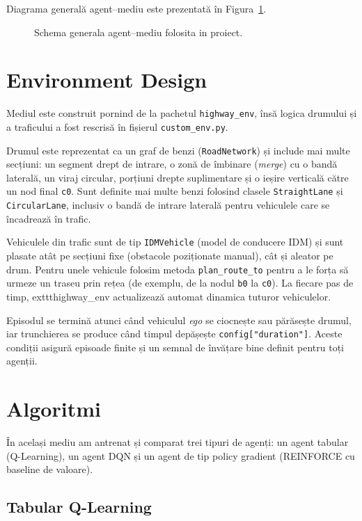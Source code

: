\documentclass[11pt,a4paper]{article}
\begin{document}
Diagrama generală agent--mediu este prezentată în Figura~\ref{fig:rl-loop}.
\begin{figure}[h]
  \centering
  \RLLoopDiagram
  \caption{Schema generala agent--mediu folosita in proiect.}
  \label{fig:rl-loop}
\end{figure}

\section{Environment Design}

Mediul este construit pornind de la pachetul \texttt{highway\_env}, însă logica drumului și a
traficului a fost rescrisă în fișierul \texttt{custom\_env.py}.

Drumul este reprezentat ca un graf de benzi (\texttt{RoadNetwork}) și include mai multe secțiuni:
un segment drept de intrare, o zonă de îmbinare (\emph{merge}) cu o bandă laterală, un viraj
circular, porțiuni drepte suplimentare și o ieșire verticală către un nod final \texttt{c0}.
Sunt definite mai multe benzi folosind clasele \texttt{StraightLane} și \texttt{CircularLane},
inclusiv o bandă de intrare laterală pentru vehiculele care se încadrează în trafic.

Vehiculele din trafic sunt de tip \texttt{IDMVehicle} (model de conducere IDM) și sunt plasate
atât pe secțiuni fixe (obstacole poziționate manual), cât și aleator pe drum. Pentru unele
vehicule folosim metoda \texttt{plan\_route\_to} pentru a le forța să urmeze un traseu prin
rețea (de exemplu, de la nodul \texttt{b0} la \texttt{c0}). La fiecare pas de timp,
  	exttt{highway\_env} actualizează automat dinamica tuturor vehiculelor.

Episodul se termină atunci când vehiculul \emph{ego} se ciocnește sau părăsește drumul, iar
trunchierea se produce când timpul depășește \texttt{config["duration"]}. Aceste condiții asigură
episoade finite și un semnal de învățare bine definit pentru toți agenții.

\section{Algoritmi}

În același mediu am antrenat și comparat trei tipuri de agenți:
un agent tabular (Q-Learning), un agent DQN și un agent de tip policy gradient
(REINFORCE cu baseline de valoare).

\subsection{Tabular Q-Learning}
\end{document}
